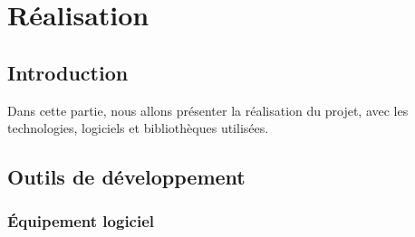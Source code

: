\documentclass{article}
\begin{document}
            
    \section{Réalisation}
        \subsection{Introduction}
            Dans cette partie, nous allons présenter la réalisation du projet, avec les technologies, logiciels et bibliothèques utilisées.
        \subsection{Outils de développement}
                
                \subsubsection{Équipement logiciel}
\end{document}
